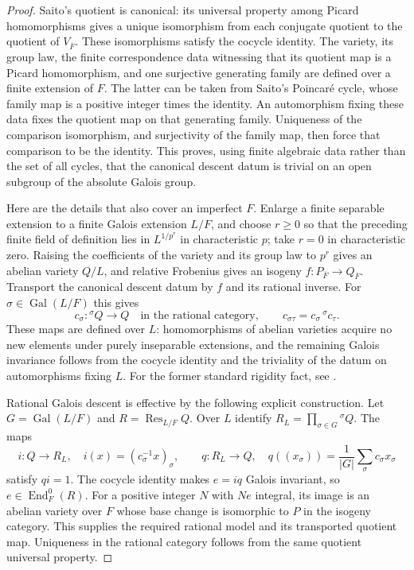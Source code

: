 \documentclass[11pt,a4paper]{article}
\begin{document}
\begin{proof}
Saito's quotient is canonical: its universal property among Picard
homomorphisms gives a unique isomorphism from each conjugate quotient
to the quotient of $V_{\overline F}$.  These isomorphisms satisfy the
cocycle identity.  The variety, its group law, the finite correspondence
data witnessing that its quotient map is a Picard homomorphism, and
one surjective generating family are defined over a finite extension
of $F$.  The latter can be taken from Saito's Poincar\'e cycle, whose
family map is a positive integer times the identity.  An automorphism
fixing these data fixes the quotient map on that generating family.
Uniqueness of the comparison isomorphism, and surjectivity of the
family map, then force that comparison to be the identity.  This
proves, using finite algebraic data rather than the set of all cycles,
that the canonical descent datum is trivial on an open subgroup of
the absolute Galois group.

Here are the details that also cover an imperfect $F$.  Enlarge a
finite separable extension to a finite Galois extension $L/F$, and
choose $r\ge0$ so that the preceding finite field of definition lies
in $L^{1/p^r}$ in characteristic $p$; take $r=0$ in characteristic
zero.  Raising the coefficients of the variety and its group law to
$p^r$ gives an abelian variety $Q/L$, and relative Frobenius gives an
isogeny $f:P_{\overline F}\to Q_{\overline F}$.
Transport the canonical descent datum by $f$ and its rational inverse.
For $\sigma\in\operatorname{Gal}(L/F)$ this gives
\[
 c_\sigma:{}^\sigma Q\longrightarrow Q
 \quad\text{in the rational category},\qquad
 c_{\sigma\tau}=c_\sigma\,{}^\sigma c_\tau.
\]
These maps are defined over $L$: homomorphisms of abelian varieties
acquire no new elements under purely inseparable extensions, and the
remaining Galois invariance follows from the cocycle identity and the
triviality of the datum on automorphisms fixing $L$.  For the former
standard rigidity fact, see \cite[Example~4.2.14, p.~38]{ConradAV}.

Rational Galois descent is effective by the following explicit
construction.  Let $G=\operatorname{Gal}(L/F)$ and
$R=\operatorname{Res}_{L/F}Q$.  Over $L$ identify
$R_L=\prod_{\sigma\in G}{}^\sigma Q$.  The maps
\[
 i:Q\longrightarrow R_L,\quad
 i(x)=(c_\sigma^{-1}x)_\sigma,
 \qquad
 q:R_L\longrightarrow Q,\quad
 q((x_\sigma))=\frac1{|G|}\sum_\sigma c_\sigma x_\sigma
\]
satisfy $qi=1$.  The cocycle identity makes $e=iq$ Galois invariant,
so $e\in\operatorname{End}^0_F(R)$.  For a positive integer $N$ with
$Ne$ integral, its image is an abelian variety over $F$ whose base
change is isomorphic to $P$ in the isogeny category.  This supplies the
required rational model and its transported quotient map.  Uniqueness
in the rational category follows from the same quotient universal
property.


\end{proof}
\end{document}
